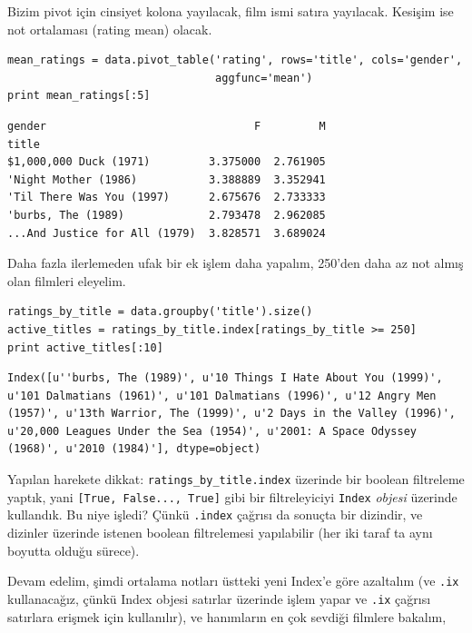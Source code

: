 \documentclass[12pt,fleqn]{article}\usepackage{../../common}
\begin{document}
Bizim pivot için cinsiyet kolona yayılacak, film ismi satıra
yayılacak. Kesişim ise not ortalaması (rating mean) olacak.

\begin{verbatim}
mean_ratings = data.pivot_table('rating', rows='title', cols='gender',
                                aggfunc='mean')
print mean_ratings[:5]
\end{verbatim}

\begin{verbatim}
gender                                F         M
title                                            
$1,000,000 Duck (1971)         3.375000  2.761905
'Night Mother (1986)           3.388889  3.352941
'Til There Was You (1997)      2.675676  2.733333
'burbs, The (1989)             2.793478  2.962085
...And Justice for All (1979)  3.828571  3.689024
\end{verbatim}

Daha fazla ilerlemeden ufak bir ek işlem daha yapalım, 250'den daha az
not almış olan filmleri eleyelim.

\begin{verbatim}
ratings_by_title = data.groupby('title').size()
active_titles = ratings_by_title.index[ratings_by_title >= 250]
print active_titles[:10]
\end{verbatim}

\begin{verbatim}
Index([u''burbs, The (1989)', u'10 Things I Hate About You (1999)', u'101 Dalmatians (1961)', u'101 Dalmatians (1996)', u'12 Angry Men (1957)', u'13th Warrior, The (1999)', u'2 Days in the Valley (1996)', u'20,000 Leagues Under the Sea (1954)', u'2001: A Space Odyssey (1968)', u'2010 (1984)'], dtype=object)
\end{verbatim}

Yapılan harekete dikkat: \verb!ratings_by_title.index! üzerinde bir boolean
filtreleme yaptık, yani \verb![True, False..., True]!  gibi bir
filtreleyiciyi \verb!Index! {\em objesi} üzerinde kullandık. Bu niye
işledi? Çünkü \verb!.index! çağrısı da sonuçta bir dizindir, ve dizinler
üzerinde istenen boolean filtrelemesi yapılabilir (her iki taraf ta aynı
boyutta olduğu sürece).

Devam edelim, şimdi ortalama notları üstteki yeni Index'e göre
azaltalım (ve \verb!.ix! kullanacağız, çünkü Index objesi
satırlar üzerinde işlem yapar ve \verb!.ix! çağrısı satırlara
erişmek için kullanılır), ve hanımların en çok sevdiği filmlere
bakalım,
\end{document}

